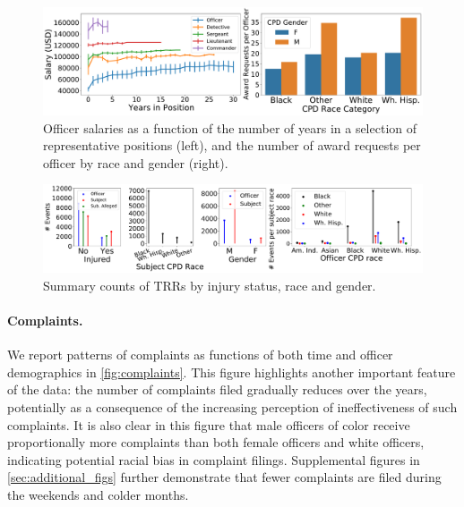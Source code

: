 \begin{figure}[t!] 
\includegraphics[width=\textwidth]{figs/salary_awards.pdf} 
\caption{Officer salaries as a function of the number of years in a selection of representative positions (left),
and the number of award requests per officer by race and gender (right).} \label{fig:salary_awards}
\end{figure}
\begin{figure}[t!] 
	\includegraphics[width=\textwidth]{figs/trr_stats} 
	\caption{Summary counts of TRRs by injury status, race and gender.} \label{fig:trrs_stats1}
\end{figure}


\paragraph{Complaints.} 
We report patterns of complaints as functions of both time and officer
demographics in \cref{fig:complaints}. This figure highlights another important
feature of the data: the number of complaints filed gradually reduces over the
years, potentially as a consequence of the increasing perception 
of ineffectiveness of
such complaints.  It is also clear in this figure that male officers
of color receive proportionally more complaints than both female officers and
white officers, indicating potential racial bias in complaint filings.
Supplemental figures in \cref{sec:additional_figs} further demonstrate that
fewer complaints are filed during the weekends and colder months.

